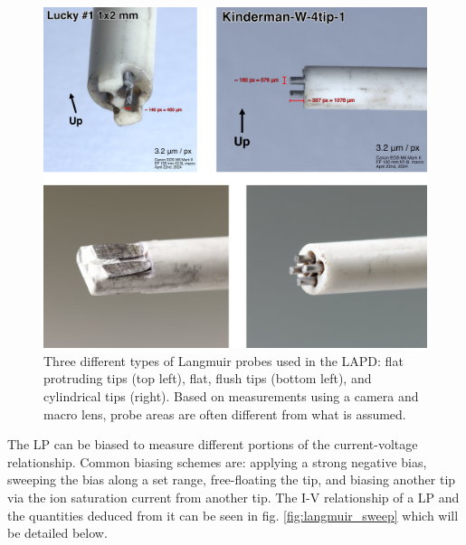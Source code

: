 \begin{figure}
	\centering
	\includegraphics[width=\textwidth]{figures/langmuir_pics.jpg}
	\caption[Images of Langmuir probes used in the LAPD]{\label{fig:langmuir_tips}Three different types of Langmuir probes used in the LAPD: flat protruding tips (top left), flat, flush tips (bottom left), and cylindrical tips (right). Based on measurements using a camera and macro lens, probe areas are often different from what is assumed.}
\end{figure}

The LP can be biased to measure different portions of the current-voltage relationship. Common biasing schemes are: applying a strong negative bias, sweeping the bias along a set range, free-floating the tip, and biasing another tip via the ion saturation current  from another tip. The I-V relationship of a LP and the quantities deduced from it can be seen in fig. \ref{fig:langmuir_sweep} which will be detailed below.

